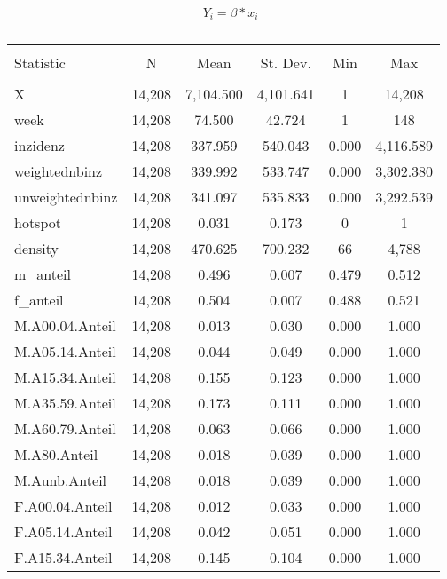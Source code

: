 \documentclass{article}
\begin{document}
\begin{equation}

	Y_i = \beta * x_i

\end{equation}

\begin{table}[!htbp] \centering 
  \caption{} 
  \label{} 
\begin{tabular}{@{\extracolsep{5pt}}lccccc} 
\\[-1.8ex]\hline 
\hline \\[-1.8ex] 
Statistic & \multicolumn{1}{c}{N} & \multicolumn{1}{c}{Mean} & \multicolumn{1}{c}{St. Dev.} & \multicolumn{1}{c}{Min} & \multicolumn{1}{c}{Max} \\ 
\hline \\[-1.8ex] 
X & 14,208 & 7,104.500 & 4,101.641 & 1 & 14,208 \\ 
week & 14,208 & 74.500 & 42.724 & 1 & 148 \\ 
inzidenz & 14,208 & 337.959 & 540.043 & 0.000 & 4,116.589 \\ 
weightednbinz & 14,208 & 339.992 & 533.747 & 0.000 & 3,302.380 \\ 
unweightednbinz & 14,208 & 341.097 & 535.833 & 0.000 & 3,292.539 \\ 
hotspot & 14,208 & 0.031 & 0.173 & 0 & 1 \\ 
density & 14,208 & 470.625 & 700.232 & 66 & 4,788 \\ 
m\_anteil & 14,208 & 0.496 & 0.007 & 0.479 & 0.512 \\ 
f\_anteil & 14,208 & 0.504 & 0.007 & 0.488 & 0.521 \\ 
M.A00.04.Anteil & 14,208 & 0.013 & 0.030 & 0.000 & 1.000 \\ 
M.A05.14.Anteil & 14,208 & 0.044 & 0.049 & 0.000 & 1.000 \\ 
M.A15.34.Anteil & 14,208 & 0.155 & 0.123 & 0.000 & 1.000 \\ 
M.A35.59.Anteil & 14,208 & 0.173 & 0.111 & 0.000 & 1.000 \\ 
M.A60.79.Anteil & 14,208 & 0.063 & 0.066 & 0.000 & 1.000 \\ 
M.A80.Anteil & 14,208 & 0.018 & 0.039 & 0.000 & 1.000 \\ 
M.Aunb.Anteil & 14,208 & 0.018 & 0.039 & 0.000 & 1.000 \\ 
F.A00.04.Anteil & 14,208 & 0.012 & 0.033 & 0.000 & 1.000 \\ 
F.A05.14.Anteil & 14,208 & 0.042 & 0.051 & 0.000 & 1.000 \\ 
F.A15.34.Anteil & 14,208 & 0.145 & 0.104 & 0.000 & 1.000 \\ 

\end{tabular}
\end{table}
\end{document}
